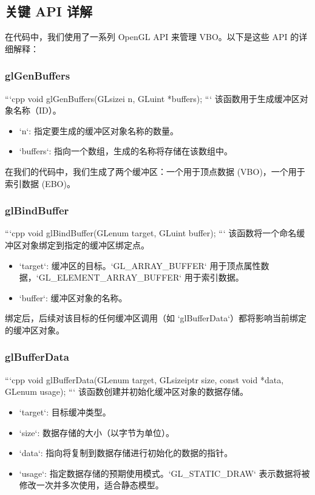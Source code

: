 \documentclass[a4paper]{article}
\begin{document}
\subsection{关键 API 详解}
在代码中，我们使用了一系列 OpenGL API 来管理 VBO。以下是这些 API 的详细解释：

\subsubsection{glGenBuffers}
```cpp
void glGenBuffers(GLsizei n, GLuint *buffers);
```
该函数用于生成缓冲区对象名称（ID）。
\begin{itemize}
    \item `n`: 指定要生成的缓冲区对象名称的数量。
    \item `buffers`: 指向一个数组，生成的名称将存储在该数组中。
\end{itemize}
在我们的代码中，我们生成了两个缓冲区：一个用于顶点数据 (VBO)，一个用于索引数据 (EBO)。

\subsubsection{glBindBuffer}
```cpp
void glBindBuffer(GLenum target, GLuint buffer);
```
该函数将一个命名缓冲区对象绑定到指定的缓冲区绑定点。
\begin{itemize}
    \item `target`: 缓冲区的目标。`GL_ARRAY_BUFFER` 用于顶点属性数据，`GL_ELEMENT_ARRAY_BUFFER` 用于索引数据。
    \item `buffer`: 缓冲区对象的名称。
\end{itemize}
绑定后，后续对该目标的任何缓冲区调用（如 `glBufferData`）都将影响当前绑定的缓冲区对象。

\subsubsection{glBufferData}
```cpp
void glBufferData(GLenum target, GLsizeiptr size, const void *data, GLenum usage);
```
该函数创建并初始化缓冲区对象的数据存储。
\begin{itemize}
    \item `target`: 目标缓冲类型。
    \item `size`: 数据存储的大小（以字节为单位）。
    \item `data`: 指向将复制到数据存储进行初始化的数据的指针。
    \item `usage`: 指定数据存储的预期使用模式。`GL_STATIC_DRAW` 表示数据将被修改一次并多次使用，适合静态模型。
\end{itemize}
\end{document}

